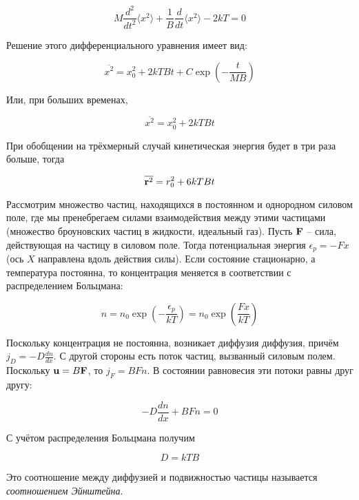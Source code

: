 \begin{equation}
    M \frac{d^2}{dt^2} \langle x^2 \rangle + \frac{1}{B} \frac{d}{dt} \langle x^2 \rangle - 2 k T = 0
\end{equation}

\noindent
Решение этого дифференциального уравнения имеет вид:

\begin{equation*}
    \overline{x^2} = x_0^2 + 2 k T B t + C \exp \left( - \frac{t}{M B} \right)
\end{equation*}

\noindent
Или, при больших временах,

\begin{equation}
    \overline{x^2} = x_0^2 + 2 k T B t
\end{equation}

\noindent
При обобщении на трёхмерный случай кинетическая энергия будет в три раза больше, тогда

\begin{equation}
    \overline{\mathbf{r}^2} = r_0^2 + 6 k T B t
\end{equation}

Рассмотрим множество частиц, находящихся в постоянном и однородном силовом поле, где мы пренебрегаем силами взаимодействия между этими частицами (множество броуновских частиц в жидкости, идеальный газ). Пусть $\mathbf F$ -- сила, действующая на частицу в силовом поле. Тогда потенциальная энергия $\epsilon_p = - F x$ (ось $X$ направлена вдоль действия силы). Если состояние стационарно, а температура постоянна, то концентрация меняется в соответствии с распределением Больцмана:

\begin{equation}
    n = n_0 \exp \left( - \frac{\epsilon_p}{k T} \right) = n_0 \exp \left( \frac{F x}{k T} \right)
\end{equation}

Поскольку концентрация не постоянна, возникает диффузия диффузия, причём $j_D = - D \frac{dn}{dx}$. С другой стороны есть поток частиц, вызванный силовым полем. Поскольку $\mathbf u = B \mathbf F$, то $j_F = B F n$. В состоянии равновесия эти потоки равны друг другу:

\begin{equation*}
    -D \frac{dn}{dx} + B F n = 0
\end{equation*}

\noindent
С учётом распределения Больцмана получим

\begin{equation}
    D = k T B
\end{equation}

\noindent
Это соотношение между диффузией и подвижностью частицы называется \textit{соотношением Эйнштейна}.